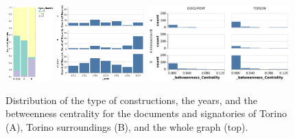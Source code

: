 \begin{figure}[!ht]
    \centering



    \includegraphics[height=110px]{static/figures/ComBiNet/OriginalPaperFigures/CGF/TurinPlots/type+chantier.pdf}
    \includegraphics[height=110px]{static/figures/ComBiNet/OriginalPaperFigures/CGF/TurinPlots/time.pdf}
    \includegraphics[height=110px]{static/figures/ComBiNet/TorinoCompBC.pdf}

    \caption{Distribution of the type of constructions, the years, and the betweenness centrality for the documents and signatories of Torino (A), Torino surroundings (B), and the whole graph (top).}\label{fig:attributeComparison}
\end{figure}


